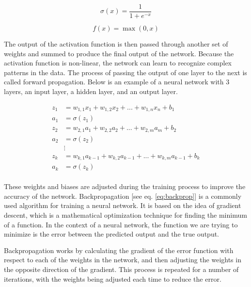 \begin{equation} \label{eq:sigmoid}
    \sigma(x) = \frac{1}{1 + e^{-x}}
\end{equation}

\begin{equation}\label{eq:relu}
    f(x) = \max(0, x)
\end{equation}

The output of the activation function is then passed through another set of weights and summed to produce the final output of the network. Because the activation function is non-linear, the network can learn to recognize complex patterns in the data. The process of passing the output of one layer to the next is called forward propagation. Below is an example of a neural network with 3 layers, an input layer, a hidden layer, and an output layer.

\begin{align*}
    z_1 & = w_{1,1}x_1 + w_{1,2}x_2 + ... + w_{1,n}x_n + b_1             \\
    a_1 & = \sigma(z_1)                                                  \\
    z_2 & = w_{2,1}a_1 + w_{2,2}a_2 + ... + w_{2,m}a_m + b_2             \\
    a_2 & = \sigma(z_2)                                                  \\
        & \vdots                                                         \\
    z_k & = w_{k,1}a_{k-1} + w_{k,2}a_{k-1} + ... + w_{k,m}a_{k-1} + b_k \\
    a_k & = \sigma(z_k)                                                  \\
\end{align*}

These weights and biases are adjusted during the training process to improve the accuracy of the network. Backpropagation [see eq. \ref{eq:backprop}] is a commonly used algorithm for training a neural network. It is based on the idea of gradient descent, which is a mathematical optimization technique for finding the minimum of a function. In the context of a neural network, the function we are trying to minimize is the error between the predicted output and the true output.

Backpropagation works by calculating the gradient of the error function with respect to each of the weights in the network, and then adjusting the weights in the opposite direction of the gradient. This process is repeated for a number of iterations, with the weights being adjusted each time to reduce the error.


